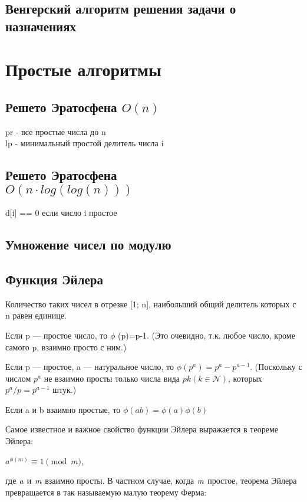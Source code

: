 \documentclass[a4paper]{article}
\begin{document}
\begin{multicols*}{2}
		\subsection{Венгерский алгоритм решения задачи о назначениях}
		
		
		\section{Простые алгоритмы}		
		\subsection{Решето Эратосфена $O(n)$}
		pr - все простые числа до n \\
		lp - минимальный простой делитель числа i
		 
		

		\subsection{Решето Эратосфена \\ $O(n \cdot log(log(n)))$}
		d[i] == 0 если число i простое
		
		\subsection{Умножение чисел по модулю}
		
		\subsection{Функция Эйлера}
		Количество таких чисел в отрезке [1; n], наибольший общий делитель которых с n равен единице.
		
		Если p — простое число, то $\phi$ (p)=p-1.
		(Это очевидно, т.к. любое число, кроме самого p, взаимно просто с ним.)
		
		Если p — простое, a — натуральное число, то $\phi (p^a)=p^a-p^{a-1}$.
		(Поскольку с числом $p^a$ не взаимно просты только числа вида $pk (k \in \mathcal{N})$, которых $p^a / p = p^{a-1}$ штук.)
		
		Если a и b взаимно простые, то $\phi(ab) = \phi(a) \phi(b) $
		
		Самое известное и важное свойство функции Эйлера выражается в теореме Эйлера:
		
		$a^{\phi(m)} \equiv 1 \pmod m$, 
		
		где $\it a$ и $\it m$ взаимно просты.
		В частном случае, когда $\it m$ простое, теорема Эйлера превращается в так называемую малую теорему Ферма:
		

\end{multicols*}
\end{document}
